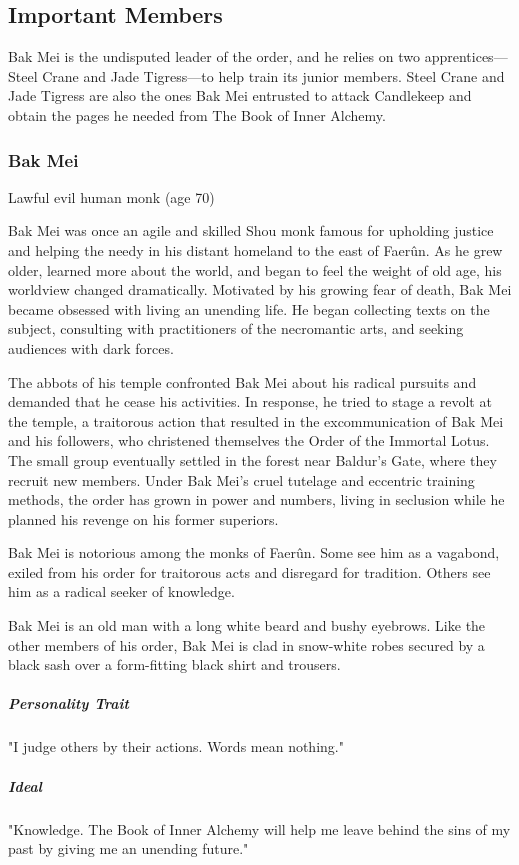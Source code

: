 \documentclass[10pt,a4paper,twoside,bg=print,twocolumn,openany,nodeprecatedcode]{dndbook}
\begin{document}
\subsection{Important Members}
Bak Mei is the undisputed leader of the order, and he relies on two apprentices—Steel Crane and Jade Tigress—to help train its junior members. Steel Crane and Jade Tigress are also the ones Bak Mei entrusted to attack Candlekeep and obtain the pages he needed from The Book of Inner Alchemy.

\subsubsection{Bak Mei}
Lawful evil human monk (age 70)

Bak Mei was once an agile and skilled Shou monk famous for upholding justice and helping the needy in his distant homeland to the east of Faerûn. As he grew older, learned more about the world, and began to feel the weight of old age, his worldview changed dramatically. Motivated by his growing fear of death, Bak Mei became obsessed with living an unending life. He began collecting texts on the subject, consulting with practitioners of the necromantic arts, and seeking audiences with dark forces.

The abbots of his temple confronted Bak Mei about his radical pursuits and demanded that he cease his activities. In response, he tried to stage a revolt at the temple, a traitorous action that resulted in the excommunication of Bak Mei and his followers, who christened themselves the Order of the Immortal Lotus. The small group eventually settled in the forest near Baldur's Gate, where they recruit new members. Under Bak Mei's cruel tutelage and eccentric training methods, the order has grown in power and numbers, living in seclusion while he planned his revenge on his former superiors.

Bak Mei is notorious among the monks of Faerûn. Some see him as a vagabond, exiled from his order for traitorous acts and disregard for tradition. Others see him as a radical seeker of knowledge.

Bak Mei is an old man with a long white beard and bushy eyebrows. Like the other members of his order, Bak Mei is clad in snow-white robes secured by a black sash over a form-fitting black shirt and trousers.

\subparagraph{Personality Trait}
"I judge others by their actions. Words mean nothing."

\subparagraph{Ideal}
"Knowledge. The Book of Inner Alchemy will help me leave behind the sins of my past by giving me an unending future."
\end{document}
